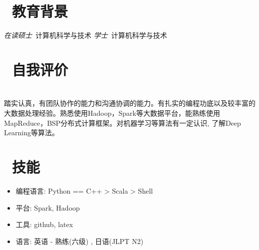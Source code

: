\documentclass[10pt]{resume}
\begin{document}


 
\section{\faGraduationCap\  教育背景}
\textit{在读硕士}\ 计算机科学与技术
\textit{学士}\ 计算机科学与技术

\section{\faTag\ 自我评价}
\ \ \ \ \\踏实认真，有团队协作的能力和沟通协调的能力。有扎实的编程功底以及较丰富的大数据处理经验。熟悉使用Hadoop，Spark等大数据平台，能熟练使用MapReduce，BSP分布式计算框架。对机器学习等算法有一定认识, 了解Deep Learning等算法。

\section{\faCogs\ 技能}
\begin{itemize}[parsep=0.5ex]
  \item 编程语言: Python == C++ > Scala > Shell
  \item 平台: Spark, Hadoop
  \item 工具: github, latex
  \item 语言: 英语 - 熟练(六级) , 日语(JLPT N2)

\end{itemize}
\end{document}
